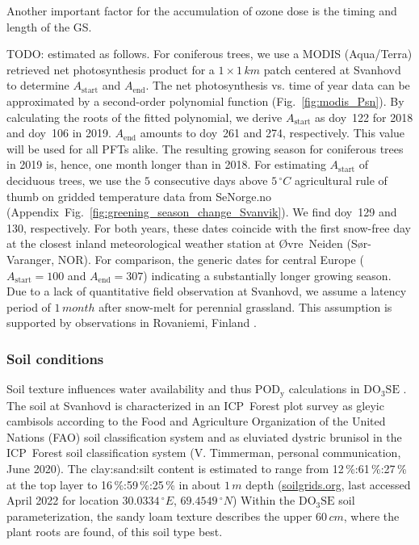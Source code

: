 \documentclass[bg, manuscript]{copernicus}
\begin{document}
Another important factor for the accumulation of ozone dose is the timing and length of the GS. 

TODO: estimated as follows. For coniferous trees, we use a MODIS (Aqua/Terra) retrieved net photosynthesis product \citep{MODIS_PSN} for a $1\times 1\,\unit{km}$ patch centered at Svanhovd to determine $A_\text{start}$ and $A_\text{end}$. The net photosynthesis vs. time of year data can be approximated by a second-order polynomial function (Fig.~\ref{fig:modis_Psn}). By calculating the roots of the fitted polynomial, we derive $A_\text{start}$ as \unit{doy}~122 for 2018 and \unit{doy}~106 in 2019. $A_\text{end}$ amounts to \unit{doy}~261 and 274, respectively. This value will be used for all PFTs alike. The resulting growing season for coniferous trees in 2019 is, hence, one month longer than in 2018. For estimating $A_\text{start}$ of deciduous trees, we use the $5$ consecutive days above $5\,\unit{^\circ C}$ agricultural rule of thumb on gridded temperature data from SeNorge.no (Appendix~Fig.~\ref{fig:greening_season_change_Svanvik}). We find \unit{doy}~129 and 130, respectively. For both years, these dates coincide with the first snow-free day at the closest inland meteorological weather station at Øvre~Neiden (Sør-Varanger, NOR). For comparison, the generic dates for central Europe ($A_\mathrm{start} = 100$ and $A_\mathrm{end} = 307$) indicating a substantially longer growing season. Due to a lack of quantitative field observation at Svanhovd, we assume a latency period of $1\,\unit{month}$ after snow-melt for perennial grassland. This assumption is supported by observations in Rovaniemi, Finland \citep[][Supplement~Fig.~S1]{FCR:Korhonen2018}.

\subsubsection{Soil conditions}
\label{subsec:soil}

Soil texture influences water availability and thus $\mathrm{POD_y}$ calculations in $\mathrm{DO_3SE}$ \citep{ACP:Bueker2012}. The soil at Svanhovd is characterized in an ICP~Forest plot survey as gleyic cambisols according to the Food and Agriculture Organization of the United Nations (FAO) soil classification system and as eluviated dystric brunisol in the ICP~Forest soil classification system (V. Timmerman, personal communication, June 2020). The clay:sand:silt content is estimated to range from 12\,\%:61\,\%:27\,\% at the top layer to 16\,\%:59\,\%:25\,\% in about $1\,\unit{m}$ depth (\href{https://soilgrids.org/}{soilgrids.org}, last accessed April 2022 for location $30.0334\,\unit{^\circ E}$, $69.4549\,\unit{^\circ N}$) Within the $\mathrm{DO_3SE}$ soil parameterization, the sandy loam texture describes the upper $60\,\unit{cm}$, where the plant roots are found, of this soil type best. 
\end{document}

